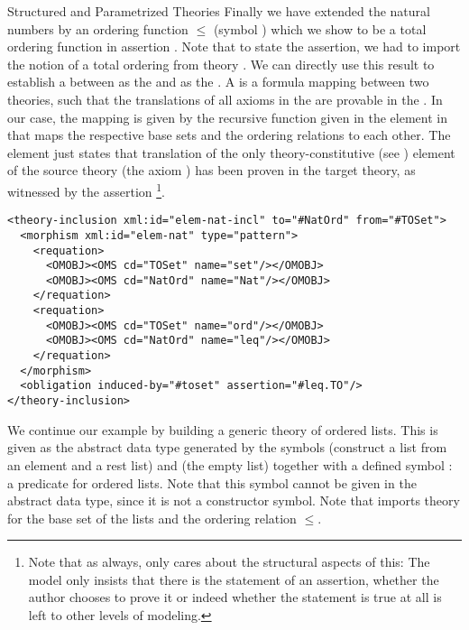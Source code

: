 \begin{tchapter}[id=natlist]{Structured and Parametrized Theories}
Finally we have extended the natural numbers by an ordering function $\leq$ (symbol
{}) which we show to be a total ordering function in assertion
{}.  Note that to state the assertion, we had to import the notion of a
total ordering from theory {}. We can directly use this result to establish
a {} between {} as the
{} and {} as the {}. A
{} is a formula mapping between two theories, such that the
translations of all axioms in the {} are provable in the
{}. In our case, the mapping is given by the recursive function
given in the {} element in {} that maps the respective
base sets and the ordering relations to each other. The {} element
just states that translation of the only theory-constitutive
(see ) element of the source theory (the axiom
{}) has been proven in the target theory, as witnessed
by the assertion {}\footnote{Note that as always,
  {\omdoc} only cares about the structural aspects of this: The
  {\omdoc} model only insists that there is the statement of an
  assertion, whether the author chooses to prove it or indeed whether
  the statement is true at all is left to other levels of modeling.}.

\begin{lstlisting}[mathescape,label=lst:nat-ti,
  index={theory,symbol,definition,assertion}]
<theory-inclusion xml:id="elem-nat-incl" to="#NatOrd" from="#TOSet">
  <morphism xml:id="elem-nat" type="pattern">
    <requation>
      <OMOBJ><OMS cd="TOSet" name="set"/></OMOBJ>
      <OMOBJ><OMS cd="NatOrd" name="Nat"/></OMOBJ>
    </requation>
    <requation>
      <OMOBJ><OMS cd="TOSet" name="ord"/></OMOBJ>
      <OMOBJ><OMS cd="NatOrd" name="leq"/></OMOBJ>
    </requation>
  </morphism>
  <obligation induced-by="#toset" assertion="#leq.TO"/>
</theory-inclusion>
\end{lstlisting}

We continue our example by building a generic theory {} of ordered lists.
This is given as the abstract data type generated by the symbols {}
(construct a list from an element and a rest list) and {} (the empty list)
together with a defined symbol {}: a predicate for ordered lists. Note
that this symbol cannot be given in the abstract data type, since it is not a constructor
symbol. Note that {} imports theory {} for the base set of
the lists and the ordering relation $\leq$.


\end{tchapter}
